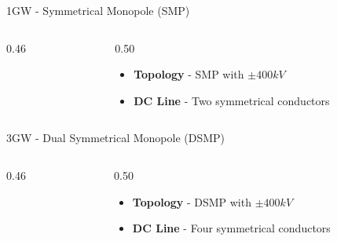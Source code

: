 


\begin{frame}{1GW - Symmetrical Monopole (SMP)}
  \begin{columns}[c,onlytextwidth]
    \begin{column}{0.46\textwidth}
      \centering
    \end{column}
    \begin{column}{0.50\textwidth}
      \vspace{0.5em}
      \begin{itemize}
        \setlength{\itemsep}{0.7em}
        \item \textbf{Topology} - SMP with $\pm400kV$
        \item \textbf{DC Line} - Two symmetrical conductors
      \end{itemize}
    \end{column}
  \end{columns}
\end{frame}


\begin{frame}{3GW - Dual Symmetrical Monopole (DSMP)}
  \begin{columns}[c,onlytextwidth]
    \begin{column}{0.46\textwidth}
      \centering
    \end{column}
    \begin{column}{0.50\textwidth}
      \vspace{0.5em}
      \begin{itemize}
        \setlength{\itemsep}{0.7em}
        \item \textbf{Topology} - DSMP with $\pm400kV$
        \item \textbf{DC Line} - Four symmetrical conductors
      \end{itemize}
    \end{column}
  \end{columns}
\end{frame}


